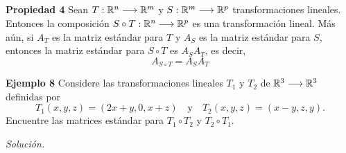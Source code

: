 
\subsection{}

\begin{frame}%
	
	\begin{prop}{\textbf{Propiedad 4}}
		\justifying
		Sean $T:\mathbb{R}^n\longrightarrow\mathbb{R}^m$ y $S:\mathbb{R}^m\longrightarrow\mathbb{R}^p$ transformaciones lineales. Entonces la composición $S\circ T: \mathbb{R}^n\longrightarrow\mathbb{R}^p$ es una transformación lineal. Más aún, si $A_{T}$ es la matriz estándar para $T$ y 
		$A_{S}$ es la matriz estándar para $S$, entonces la matriz estándar para $S\circ T$ es $A_{S} A_{T}$, es decir,
		\[
		A_{S\circ T} = A_{S} A_{T}
		\]
	\end{prop}

	\begin{ej}{\textbf{Ejemplo 8}}
		\justifying
		Considere las transformaciones lineales $T_1$ y $T_2$ de $\mathbb{R}^3\longrightarrow\mathbb{R}^3$ definidas por
		\[
		T_1(x,y,z) = (2x+y,0,x+z) \quad \text{y} \quad T_2(x,y,z) = (x-y,z,y).
		\]		
		Encuentre las matrices estándar para  $T_1\circ T_2$ y $T_2\circ T_1$.
	\end{ej}
	\textit{Solución.}
	
\end{frame}


\subsection{}


